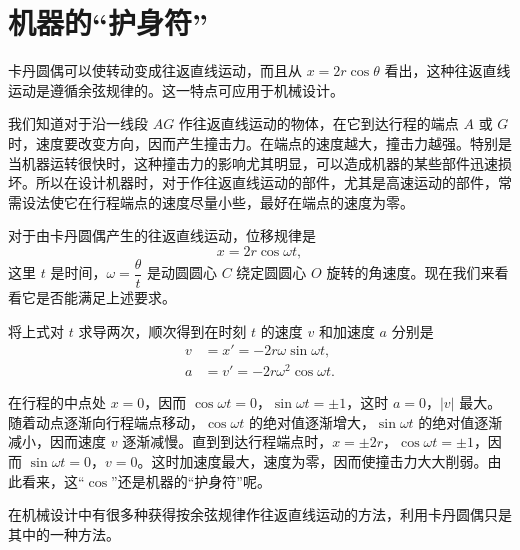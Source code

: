 \section{机器的“护身符”}

卡丹圆偶可以使转动变成往返直线运动，而且从 $x=2r\cos\theta$ 看出，这种往返直线运动是遵循余弦规律的。这一特点可应用于机械设计。

我们知道对于沿一线段 $AG$ 作往返直线运动的物体，在它到达行程的端点 $A$ 或 $G$ 时，速度要改变方向，因而产生撞击力。在端点的速度越大，撞击力越强。特别是当机器运转很快时，这种撞击力的影响尤其明显，可以造成机器的某些部件迅速损坏。所以在设计机器时，对于作往返直线运动的部件，尤其是高速运动的部件，常需设法使它在行程端点的速度尽量小些，最好在端点的速度为零。

对于由卡丹圆偶产生的往返直线运动，位移规律是
\[
  x = 2r\cos\omega t,
\]
这里 $t$ 是时间，$\omega = \dfrac{\theta}{t}$ 是动圆圆心 $C$ 绕定圆圆心 $O$ 旋转的角速度。现在我们来看看它是否能满足上述要求。

将上式对 $t$ 求导两次，顺次得到在时刻 $t$ 的速度 $v$ 和加速度 $a$ 分别是
\begin{align*}
  v &= x' = -2r\omega\sin\omega t, \\
  a &= v' = -2r\omega^2\cos\omega t.
\end{align*}

在行程的中点处 $x=0$，因而 $\cos\omega t=0$，$\sin\omega t=\pm 1$，这时 $a=0$，$|v|$ 最大。随着动点逐渐向行程端点移动，$\cos\omega t$ 的绝对值逐渐增大，$\sin\omega t$ 的绝对值逐渐减小，因而速度 $v$ 逐渐减慢。直到到达行程端点时，$x=\pm 2r$，$\cos\omega t=\pm 1$，因而 $\sin\omega t=0$，$v=0$。这时加速度最大，速度为零，因而使撞击力大大削弱。由此看来，这“$\cos$”还是机器的“护身符”呢。

在机械设计中有很多种获得按余弦规律作往返直线运动的方法，利用卡丹圆偶只是其中的一种方法。
